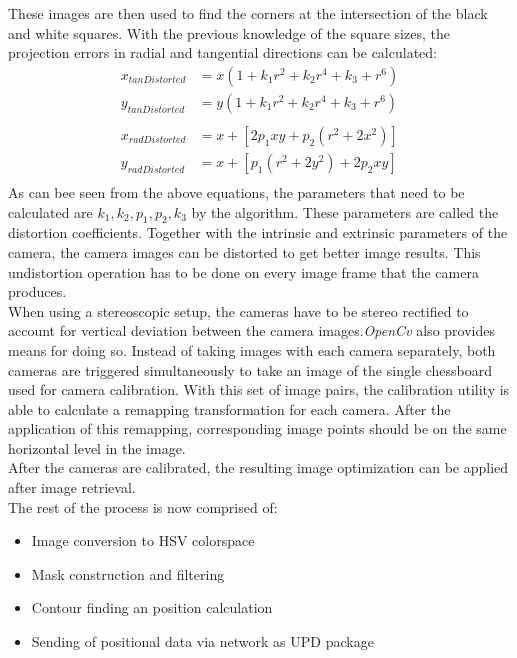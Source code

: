 These images are then used to find the corners at the intersection of the black and white squares. With the previous knowledge of the square sizes, the projection errors in radial and tangential directions can be calculated:
\begin{equation}
\begin{split}
x_{tanDistorted}&=x(1+k_{1}r^{2}+k_{2}r^{4}+k_{3}+r^{6})\\
y_{tanDistorted}&=y(1+k_{1}r^{2}+k_{2}r^{4}+k_{3}+r^{6})\\
\\
x_{radDistorted}&=x+[2p_{1}xy+p_{2}(r^{2}+2x^{2})]\\
y_{radDistorted}&=x+[p_{1}(r^{2}+2y^{2})+2p_{2}xy]\\
\end{split}
\end{equation} 
As can bee seen from the above equations, the parameters that need to be calculated are $k_{1},k_{2},p_{1},p_{2},k_{3}$ by the algorithm. These parameters are called the distortion coefficients. Together with the intrinsic and extrinsic parameters of the camera, the camera images can be distorted to get better image results. This undistortion operation has to be done on every image frame that the camera produces.\\
When using a stereoscopic setup, the cameras have to be stereo rectified to account for vertical deviation between the camera images.\textit{OpenCv} also provides means for doing so. Instead of taking images with each camera separately, both cameras are triggered simultaneously to take an image of the single chessboard used for camera calibration. With this set of image pairs, the calibration utility is able to calculate a remapping transformation for each camera. After the application of this remapping, corresponding image points should be on the same horizontal level in the image.\\After the cameras are calibrated, the resulting image optimization can be applied after image retrieval.\\The rest of the process is now comprised of:
\begin{itemize}
\item Image conversion to HSV colorspace
\item Mask construction and filtering
\item Contour finding an position calculation
\item Sending of positional data via network as UPD package
\end{itemize}
